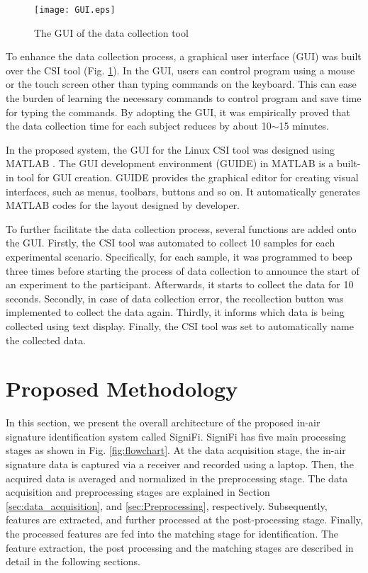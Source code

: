 \begin{figure}
	\begin{center}
		\texttt{[image: GUI.eps]}
	\end{center}
	\caption{The GUI of the data collection tool }
	\label{GUI}
\end{figure}

To enhance the data collection process, a graphical user interface (GUI) was built over the CSI tool (Fig. \ref{GUI}). In the GUI, users can control program using a mouse or the touch screen other than typing commands on the keyboard. This can ease the burden of learning the necessary commands to control program and save time for typing the commands. By adopting the GUI, it was empirically proved that the data collection time for each subject reduces by about 10$\sim$15 minutes. 

In the proposed system, the GUI for the Linux CSI tool was designed using MATLAB \cite{MATLAB}. The GUI development environment (GUIDE) in MATLAB \cite{MATLAB:GUI} is a built-in tool for GUI creation. GUIDE provides the graphical editor for creating visual interfaces, such as menus, toolbars, buttons and so on. It automatically generates MATLAB codes for the layout designed by developer. 

To further facilitate the data collection process, several functions are added onto the GUI. Firstly, the CSI tool was automated to collect 10 samples for each experimental scenario. Specifically, for each sample, it was programmed to beep three times before starting the process of data collection to announce the start of an experiment to the participant. Afterwards, it starts to collect the data for 10 seconds. Secondly, in case of data collection error, the recollection button was implemented to collect the data again. Thirdly, it informs which data is being collected using text display. Finally, the CSI tool was set to automatically name the collected data. 

\section{Proposed Methodology}
\label{sec:methodology}
In this section, we present the overall architecture of the proposed in-air signature identification system called SigniFi. SigniFi has five main processing stages as shown in Fig. \ref{fig:flowchart}. At the data acquisition stage, the in-air signature data is captured via a receiver and recorded using a laptop.
Then, the acquired data is averaged and normalized in the preprocessing stage. The data acquisition and preprocessing stages are explained in Section \ref{sec:data_acquisition}, and \ref{sec:Preprocessing}, respectively. Subsequently, features are extracted, and further processed at the post-processing stage. Finally, the processed features are fed into the matching stage for identification. The feature extraction, the post processing and the matching stages are described in detail in the following sections.

